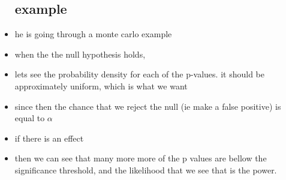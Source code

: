 \documentclass{article}
\begin{document}
\begin{itemize}
\subsection{example}
\item he is going through a monte carlo example
\item when the the null hypothesis holds, 
\item lets see the probability density for each of the p-values. it should be approximately uniform, which is what we want 
\item since then the chance that we reject the null (ie make a false positive) is equal to $\alpha$
\item if there is an effect 
\item then we can see that many more more of the p values are bellow the significance threshold, and the likelihood that we see that  is the power.



\end{itemize}
\end{document}
